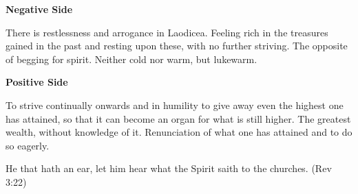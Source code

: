 \textbf{Negative Side}

There is restlessness and arrogance in Laodicea. Feeling rich in the treasures gained in the past and resting upon these, with no further striving. The opposite of begging for spirit. Neither cold nor warm, but lukewarm.

\textbf{Positive Side}

To strive continually onwards and in humility to give away even the highest one has attained, so that it can become an organ for what is still higher. The greatest wealth, without knowledge of it. Renunciation of what one has attained and to do so eagerly.

He that hath an ear, let him hear what the Spirit saith to the churches. (Rev 3:22)

